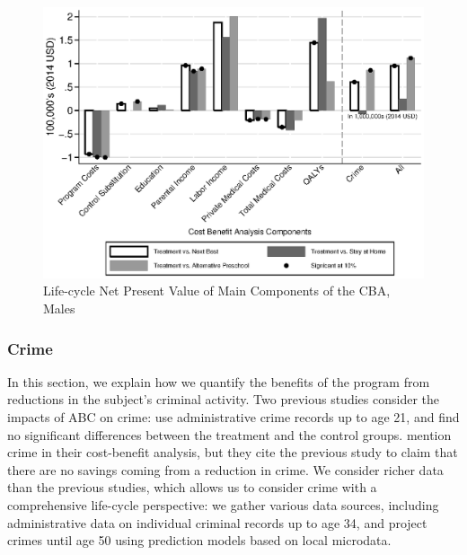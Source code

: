 \begin{figure}
\caption{Life-cycle Net Present Value of Main Components of the CBA, Males}
\label{figure:npvsm}
\centering
\includegraphics[width=.9\columnwidth]{output/abccare_npvs2.eps}
\end{figure}


\subsubsection{Crime}  \label{sec:crime}

In this section, we explain how we quantify the benefits of the program from reductions in the subject's criminal activity. Two previous studies consider the impacts of ABC on crime: \citet{Clarke_Campbell_1998_ABC_Comparison_ECRQ} use administrative crime records up to age 21, and find no significant differences between the treatment and the control groups. \cite{Barnett_Masse_2007_EER} mention crime in their cost-benefit analysis, but they cite the previous study to claim that there are no savings coming from a reduction in crime. We consider richer data than the previous studies, which allows us to consider crime with a comprehensive life-cycle perspective: we gather various data sources, including administrative data on individual criminal records up to age 34, and project crimes until age 50 using prediction models based on local microdata.

